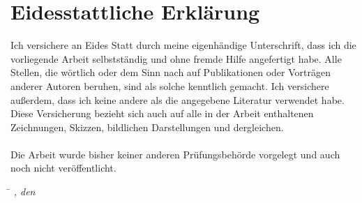 \chapter*{Eidesstattliche Erklärung}
Ich versichere an Eides Statt durch meine eigenhändige Unterschrift, dass
ich die vorliegende Arbeit selbstständig und ohne fremde Hilfe angefertigt
habe. Alle Stellen, die wörtlich oder dem Sinn nach auf Publikationen oder
Vorträgen anderer Autoren beruhen, sind als solche kenntlich gemacht.
Ich versichere außerdem, dass ich keine andere als die angegebene
Literatur verwendet habe. Diese Versicherung bezieht sich auch auf alle in
der Arbeit enthaltenen Zeichnungen, Skizzen, bildlichen Darstellungen und
dergleichen.
\\
\\
Die Arbeit wurde bisher keiner anderen Prüfungsbehörde vorgelegt und
auch noch nicht veröffentlicht.
\vspace{3cm}
\begin{tabbing}
\hspace{6cm}  \= \kill
\textit{\UNIVERSITYTOWN, den \DATE} \> \textit{\AUTHOR}
\end{tabbing}